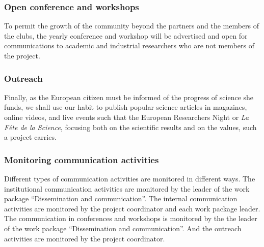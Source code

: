 \subsubsection*{Open conference and workshops}

To permit the growth of the community beyond the partners and the
members of the clubs, the yearly conference and workshop will be
advertised and open for communications to academic and industrial
researchers who are not members of the project.

\subsubsection*{Outreach}

Finally, as the European citizen must be informed of the progress of
science she funds, we shall use our habit to publish popular science
articles in magazines, online videos, and live events such that the
European Researchers Night or {\em La Fête de la Science}, focusing
both on the scientific results and on the values, such a project
carries.

\subsubsection*{Monitoring communication activities}

Different types of communication activities are monitored in
different ways.  The institutional communication activities are
monitored by the leader of the work package ``Dissemination and
communication''. The internal communication activities are monitored
by the project coordinator and each work package leader. The communication
in conferences and workshops is monitored by the
the leader of the work package ``Dissemination and
communication''. And the outreach activities are monitored by the
project coordinator.

